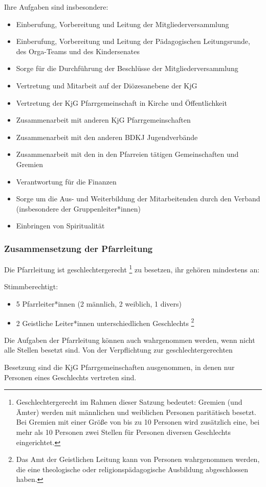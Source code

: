 \documentclass[12pt]{report}
\newcommand{\footnoteremember}[2]{%
  \footnote{#2}
  \newcounter{#1}
  \setcounter{#1}{\value{footnote}}
}
\newcommand{\footnoterecall}[1]{%
  \footnotemark[\value{#1}]
}
\begin{document}
\begin{justify}
Ihre Aufgaben sind insbesondere:
\begin{itemize}
  \item Einberufung, Vorbereitung und Leitung der Mitgliederversammlung
  \item Einberufung, Vorbereitung und Leitung der Pädagogischen Leitungsrunde, des Orga-Teams und des Kindersenates
  \item Sorge für die Durchführung der Beschlüsse der Mitgliederversammlung
  \item Vertretung und Mitarbeit auf der Diözesanebene der KjG
  \item Vertretung der KjG Pfarrgemeinschaft in Kirche und Öffentlichkeit
  \item Zusammenarbeit mit anderen KjG Pfarrgemeinschaften
  \item Zusammenarbeit mit den anderen BDKJ Jugendverbände
  \item Zusammenarbeit mit den in den Pfarreien tätigen Gemeinschaften und Gremien
  \item Verantwortung für die Finanzen
  \item Sorge um die Aus- und Weiterbildung der Mitarbeitenden durch den Verband (insbesondere der Gruppenleiter*innen)
  \item Einbringen von Spiritualität
\end{itemize}

\subsubsection{Zusammensetzung der Pfarrleitung}

Die Pfarrleitung ist geschlechtergerecht\footnoteremember{geschlechtergerecht}{Geschlechtergerecht
  im Rahmen dieser Satzung bedeutet: Gremien (und Ämter) werden mit männlichen und
  weiblichen Personen paritätisch besetzt.
  Bei Gremien mit einer Größe von bis zu 10 Personen wird zusätzlich
  eine, bei mehr als 10 Personen zwei Stellen für Personen diversen Geschlechts eingerichtet.} zu
besetzen, ihr gehören mindestens an:

Stimmberechtigt:
\begin{itemize}
  \item 5 Pfarrleiter*innen (2 männlich, 2 weiblich, 1 divers)
  \item {2 Geistliche Leiter*innen unterschiedlichen Geschlechts
        \footnoteremember{Berechtigung Geist}{Das Amt der Geistlichen Leitung
        kann von Personen wahrgenommen werden, die eine theologische oder
        religionspädagogische Ausbildung abgeschlossen haben.
  }}
\end{itemize}
Die Aufgaben der Pfarrleitung können auch wahrgenommen werden, wenn nicht alle Stellen besetzt sind.
Von der Verpflichtung zur geschlechtergerechten\footnoterecall{geschlechtergerecht}
Besetzung sind die KjG Pfarrgemeinschaften ausgenommen, in
denen nur Personen eines Geschlechts vertreten sind.


\end{justify}
\end{document}
